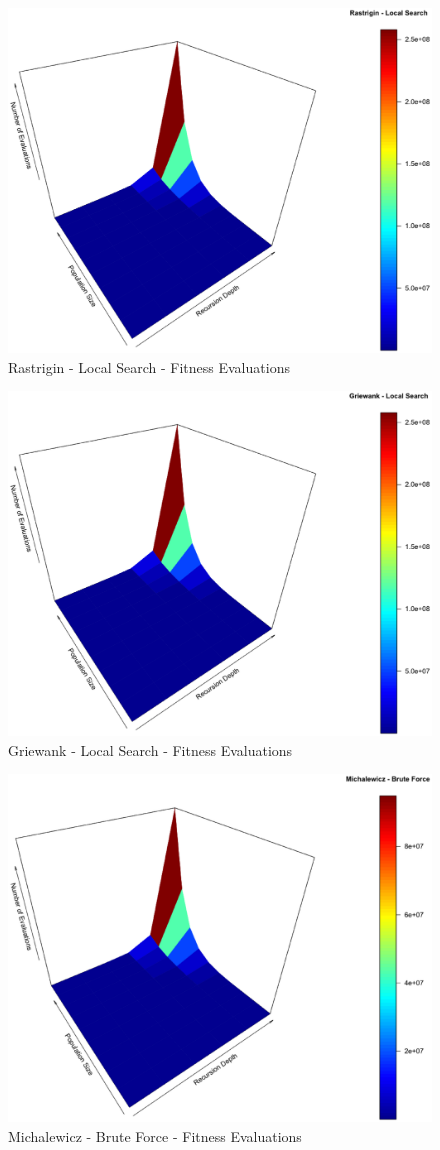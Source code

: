 \documentclass{svproc}
\begin{document}
\begin{figure}[tbp]
\centering
\includegraphics[width=1.0\hsize,height=0.65\hsize]{fig13.eps}
\caption{Rastrigin - Local Search - Fitness Evaluations}
\label{fig24}
\end{figure}

\begin{figure}[tbp]
\centering
\includegraphics[width=1.0\hsize,height=0.65\hsize]{fig16.eps}
\caption{Griewank - Local Search - Fitness Evaluations}
\label{fig25}
\end{figure}

\begin{figure}[tbp]
\centering
\includegraphics[width=1.0\hsize,height=0.65\hsize]{fig19.eps}
\caption{Michalewicz - Brute Force - Fitness Evaluations}
\label{fig26}
\end{figure}
\end{document}
